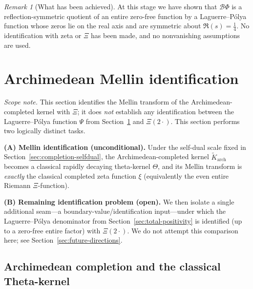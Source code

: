 \documentclass[12pt]{amsart}
\theoremstyle{definition}
\theoremstyle{remark}
\newtheorem{remark}[theorem]{Remark}
\begin{document}
\begin{remark}[What has been achieved]
At this stage we have shown that $\mathcal B\Phi$ is a reflection-symmetric
quotient of an entire zero-free function by a Laguerre--Pólya function whose
zeros lie on the real axis and are symmetric about $\Re(s)=\tfrac14$.
No identification with zeta or $\Xi$ has been made, and no nonvanishing
assumptions are used.
\end{remark}



\section{Archimedean Mellin identification}
\label{sec:arch-mellin-xi}


\noindent\emph{Scope note.} This section identifies the Mellin transform of the Archimedean-completed kernel with $\Xi$; it does \emph{not} establish any identification between the Laguerre--P\'olya function $\Psi$ from Section~\ref{sec:arch-mellin-xi} and $\Xi(2\cdot)$.
This section performs two logically distinct tasks.

\smallskip
\noindent
\textbf{(A) Mellin identification (unconditional).}
Under the self-dual scale fixed in Section~\ref{sec:completion-selfdual}, the Archimedean-completed kernel
$\widetilde K_{\mathrm{arch}}$ becomes a classical rapidly decaying theta-kernel
$\Theta$, and its Mellin transform is \emph{exactly} the classical completed zeta\cite{Titchmarsh1986,Edwards1974}
function $\xi$ (equivalently the even entire Riemann $\Xi$-function).

\smallskip
\noindent
\textbf{(B) Remaining identification problem (open).}
We then isolate a single additional seam---a boundary-value/identification input---under
which the Laguerre--P\'olya denominator from Section~\ref{sec:total-positivity}
is identified (up to a zero-free entire factor) with $\Xi(2\cdot)$. We do not attempt this comparison here; see Section~\ref{sec:future-directions}.

\subsection{Archimedean completion and the classical Theta-kernel}
\label{subsec:arch-Theta}
\end{document}
